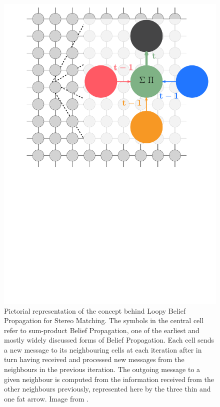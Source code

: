 \begin{figure}
    \centering
    \includegraphics[width=1.0\textwidth]{chapters/litreview/images/bp_diagram_recoloured.pdf}
    \caption[Pictorial representation of the concept behind  for \gls{sm}]{Pictorial representation of the concept behind Loopy Belief Propagation for Stereo Matching. The symbols in the central cell refer to sum-product Belief Propagation, one of the earliest and mostly widely discussed forms of Belief Propagation. Each cell sends a new message to its neighbouring cells at each iteration after in turn having received and processed new messages from the neighbours in the previous iteration. The outgoing message to a given neighbour is computed from the information received from the other neighbours previously, represented here by the three thin and one fat arrow.  Image from \cite{lbpmpsmpic}.}
    \label{fig:bpdiagram}
\end{figure}

